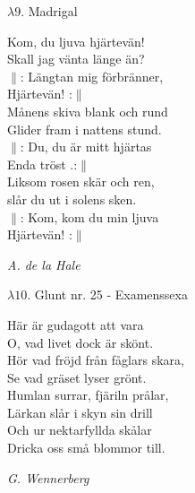 \documentclass[a6paper,10pt]{article}
\newcommand{\notis}[1]{\begin{flushright}\textit{#1}\end{flushright}}
\begin{document}
\setlength{\oddsidemargin}{-0.37in}
\noindent
\begin{center}
\Large $\lambda9$. Madrigal\\
\end{center}
Kom, du ljuva hjärtevän!\\
Skall jag vänta länge än?\\
$\|$: Längtan mig förbränner,\\
Hjärtevän! :$\|$
\vspace{5pt}\\
Månens skiva blank och rund\\
Glider fram i nattens stund.\\
$\|$: Du, du är mitt hjärtas\\
Enda tröst .:$\|$
\vspace{5pt}\\
Liksom rosen skär och ren,\\
slår du ut i solens sken.\\
$\|$: Kom, kom du min ljuva\\
Hjärtevän! :$\|$
\notis{A. de la Hale}
\vspace{30pt}
\begin{center}
\Large $\lambda10$. Glunt nr. 25 - Examenssexa\\
\end{center}
Här är gudagott att vara\\
O, vad livet dock är skönt.\\
Hör vad fröjd från fåglars skara,\\
Se vad gräset lyser grönt.\\
Humlan surrar, fjäriln prålar,\\
Lärkan slår i skyn sin drill\\
Och ur nektarfyllda skålar\\
Dricka oss små blommor till. 
\notis{G. Wennerberg}
\end{document}
